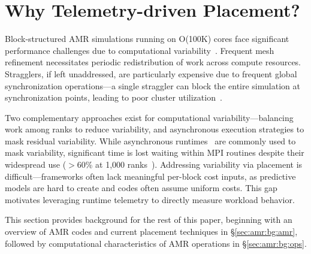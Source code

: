 
\section{Why Telemetry-driven Placement?}\label{sec:amr:bg}

Block-structured AMR simulations running on O(100K) cores face significant performance challenges
due to computational variability~\cite{VanS2009:AMR,Dubey2014:Survey,Schor2018:AMR}.
Frequent mesh refinement necessitates periodic redistribution of work across compute resources.
Stragglers, if left unaddressed, are particularly expensive due to frequent global synchronization
operations---a single straggler can block the entire simulation at synchronization points,
leading to poor cluster utilization~\cite{Petri2003:Missing}.


Two complementary approaches exist for computational variability---balancing work among ranks to
reduce variability, and asynchronous execution strategies to mask residual variability.
While asynchronous runtimes~\cite{Acun2014:Charm++, Meng2010:Uintah, Daiss2024:HPX,
  Bauer2012:Legion} are commonly used to mask variability, significant time is lost waiting within
MPI routines despite their widespread use ($>$60\% at 1,000
ranks~\cite{Klenk2017:OverviewMPICharacteristics}).
Addressing variability via placement is difficult---frameworks often lack meaningful per-block
cost inputs, as predictive models are hard to create and codes often assume uniform costs.
This gap motivates leveraging runtime telemetry to directly measure workload behavior.

This section provides background for the rest of this paper, beginning with an overview of AMR
codes and current placement techniques in \S\ref{sec:amr:bg:amr}, followed by computational
characteristics of AMR operations in \S\ref{sec:amr:bg:ops}.

